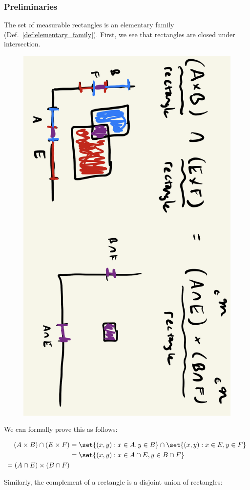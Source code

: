 \documentclass{article} %
\begin{document}
\subsubsection{Preliminaries}

\begin{remark}{}

The set of measurable rectangles is an elementary family (Def.~\ref{def:elementary_family}).  First, we see that rectangles are closed under intersection.

\begin{figure}[H]
\centering 
\includegraphics[width=.4\textwidth, angle=90]{images/rectangles_are_closed_under_intersection}	
\end{figure}

{\tiny We can formally prove this as follows:

\begin{align*}
(A \times B) \cap (E \times F)	&= \set{ (x,y) : x \in A, y \in B} \cap \set{ (x,y) : x \in E, y \in F} \\
&= \set{ (x,y) : x \in A \cap E , y \in B \cap F} \\
= (A \cap E) \times (B \cap F)
\end{align*}
}

Similarly, the complement of a rectangle is a disjoint union of rectangles:


\end{remark}
\end{document}
